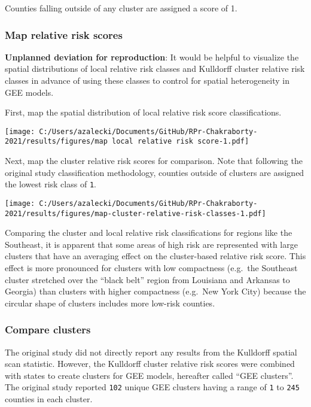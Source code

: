 \documentclass[
]{article}
\begin{document}
Counties falling outside of any cluster are assigned a score of 1.

\hypertarget{map-relative-risk-scores}{%
\subsubsection{Map relative risk
scores}\label{map-relative-risk-scores}}

\textbf{Unplanned deviation for reproduction}: It would be helpful to
visualize the spatial distributions of local relative risk classes and
Kulldorff cluster relative risk classes in advance of using these
classes to control for spatial heterogeneity in GEE models.

First, map the spatial distribution of local relative risk score
classifications.

\texttt{[image: C:/Users/azalecki/Documents/GitHub/RPr-Chakraborty-2021/results/figures/map local relative risk score-1.pdf]}

Next, map the cluster relative risk scores for comparison. Note that
following the original study classification methodology, counties
outside of clusters are assigned the lowest risk class of \texttt{1}.

\texttt{[image: C:/Users/azalecki/Documents/GitHub/RPr-Chakraborty-2021/results/figures/map-cluster-relative-risk-classes-1.pdf]}

Comparing the cluster and local relative risk classifications for
regions like the Southeast, it is apparent that some areas of high risk
are represented with large clusters that have an averaging effect on the
cluster-based relative risk score. This effect is more pronounced for
clusters with low compactness (e.g.~the Southeast cluster stretched over
the ``black belt'' region from Louisiana and Arkansas to Georgia) than
clusters with higher compactness (e.g.~New York City) because the
circular shape of clusters includes more low-risk counties.

\hypertarget{compare-clusters}{%
\subsubsection{Compare clusters}\label{compare-clusters}}

The original study did not directly report any results from the
Kulldorff spatial scan statistic. However, the Kulldorff cluster
relative risk scores were combined with states to create clusters for
GEE models, hereafter called ``GEE clusters''. The original study
reported \texttt{102} unique GEE clusters having a range of \texttt{1}
to \texttt{245} counties in each cluster.
\end{document}
